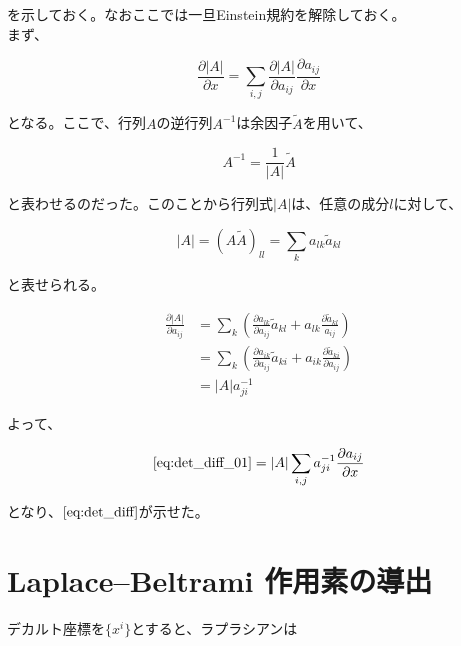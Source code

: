 \documentclass[a4paper,11pt]{article}
\begin{document}
\noindent
を示しておく。なおここでは一旦Einstein規約を解除しておく。\\
まず、

\begin{equation}
  \frac{\partial{|A|}}{\partial{x}} = \sum_{i,j} \frac{\partial{|A|}}{\partial{a_{ij}}} \frac{\partial{a_{ij}}}{\partial{x}}
  \label{eq:det_diff_01}
\end{equation}

\noindent
となる。ここで、行列$A$の逆行列$A^{-1}$は余因子$\tilde{A}$を用いて、

\begin{equation}
  A^{-1} = \frac{1}{|A|} \tilde{A}
\end{equation}

\noindent
と表わせるのだった。このことから行列式$|A|$は、任意の成分$l$に対して、

\begin{equation}
  |A| = (A\tilde{A})_{ll} = \sum_{k} a_{lk}\tilde{a}_{kl}
\end{equation}

\noindent
と表せられる。

\begin{align}
  \frac{\partial{|A|}}{\partial{a_{ij}}} & = \sum_{k}(\frac{\partial{a_{lk}}}{\partial{a_{ij}}}\tilde{a}_{kl} + a_{lk}\frac{\partial{\tilde{a}_{kl}}}{a_{ij}}) \nonumber            \\
                                         & = \sum_{k} (\frac{\partial{a_{ik}}}{\partial{a_{ij}}}\tilde{a}_{ki} + a_{ik}\frac{\partial{\tilde{a}_{ki}}}{\partial{a_{ij}}}) \nonumber \\
                                         & = |A|a^{-1}_{ji}
\end{align}

\noindent
よって、

\begin{equation}
  \eqref{eq:det_diff_01} = |A|\sum_{i,j} a^{-1}_{ji}\frac{\partial{a_{ij}}}{\partial{x}}
\end{equation}

\noindent
となり、$\eqref{eq:det_diff}$が示せた。


\section{Laplace–Beltrami 作用素の導出}

デカルト座標を$\{x^i\}$とすると、ラプラシアンは
\end{document}
